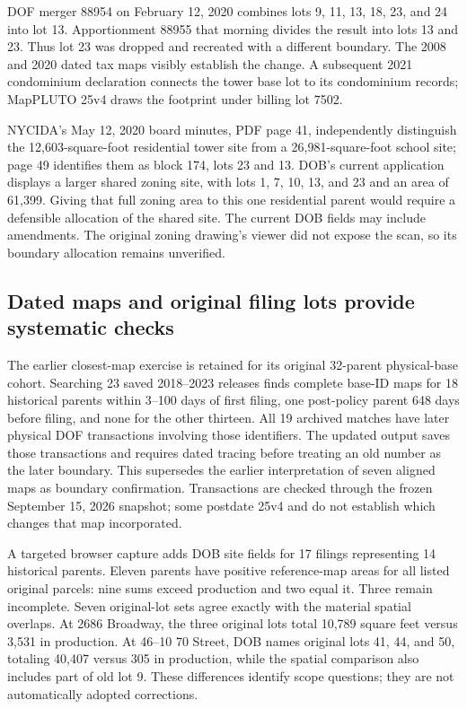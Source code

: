 DOF merger 88954 on February 12, 2020 combines lots 9, 11, 13, 18, 23, and 24
into lot 13. Apportionment 88955 that morning divides the result into lots 13
and 23. Thus lot 23 was dropped and recreated with a different boundary.
The 2008 and 2020 dated tax maps visibly establish the change. A subsequent
2021 condominium declaration connects the tower base lot to its condominium
records; MapPLUTO 25v4 draws the footprint under billing lot 7502.

NYCIDA's May 12, 2020 board minutes, PDF page 41, independently distinguish
the 12,603-square-foot residential tower site from a 26,981-square-foot school
site; page 49 identifies them as block 174, lots 23 and 13. DOB's current
application displays a larger shared zoning site, with lots 1, 7, 10, 13,
and 23 and an area of 61,399. Giving that full zoning area to this one
residential parent would require a defensible allocation of the shared site.
The current DOB fields may include amendments. The original zoning drawing's
viewer did not expose the scan, so its boundary allocation remains unverified.

\subsection*{Dated maps and original filing lots provide systematic checks}

The earlier closest-map exercise is retained for its original 32-parent
physical-base cohort. Searching 23 saved 2018--2023 releases finds complete
base-ID maps for 18 historical parents within 3--100 days of first filing,
one post-policy parent 648 days before filing, and none for the other thirteen.
All 19 archived matches have later physical DOF transactions involving those
identifiers. The updated output saves those transactions and requires dated
tracing before treating an old number as the later boundary. This supersedes
the earlier interpretation of seven aligned maps as boundary confirmation.
Transactions are checked through the frozen September 15, 2026 snapshot;
some postdate 25v4 and do not establish which changes that map incorporated.

A targeted browser capture adds DOB site fields for 17 filings representing
14 historical parents. Eleven parents have positive reference-map areas for
all listed original parcels: nine sums exceed production and two equal it.
Three remain incomplete. Seven original-lot sets agree exactly with the
material spatial overlaps. At 2686 Broadway, the three original lots total
10,789 square feet versus 3,531 in production. At 46--10 70 Street, DOB names
original lots 41, 44, and 50, totaling 40,407 versus 305 in production, while
the spatial comparison also includes part of old lot 9. These differences
identify scope questions; they are not automatically adopted corrections.

